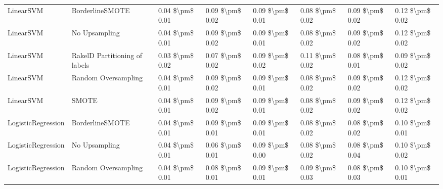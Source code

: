 \begin{tabular}{llllllll}
                      LinearSVM &               BorderlineSMOTE & 0.04 \$\textbackslash pm\$ 0.01 &           0.09 \$\textbackslash pm\$ 0.02 &       0.09 \$\textbackslash pm\$ 0.01 &        0.08 \$\textbackslash pm\$ 0.02 &                         0.09 \$\textbackslash pm\$ 0.02 &     0.12 \$\textbackslash pm\$ 0.02 \\
                      LinearSVM &                 No Upsampling & 0.04 \$\textbackslash pm\$ 0.01 &           0.09 \$\textbackslash pm\$ 0.02 &       0.09 \$\textbackslash pm\$ 0.01 &        0.08 \$\textbackslash pm\$ 0.02 &                         0.09 \$\textbackslash pm\$ 0.02 &     0.12 \$\textbackslash pm\$ 0.02 \\
                      LinearSVM & RakelD Partitioning of labels & 0.03 \$\textbackslash pm\$ 0.02 &           0.07 \$\textbackslash pm\$ 0.02 &       0.09 \$\textbackslash pm\$ 0.02 &        0.11 \$\textbackslash pm\$ 0.02 &                         0.08 \$\textbackslash pm\$ 0.01 &     0.09 \$\textbackslash pm\$ 0.02 \\
                      LinearSVM &           Random Oversampling & 0.04 \$\textbackslash pm\$ 0.01 &           0.09 \$\textbackslash pm\$ 0.02 &       0.09 \$\textbackslash pm\$ 0.01 &        0.08 \$\textbackslash pm\$ 0.02 &                         0.09 \$\textbackslash pm\$ 0.02 &     0.12 \$\textbackslash pm\$ 0.02 \\
                      LinearSVM &                         SMOTE & 0.04 \$\textbackslash pm\$ 0.01 &           0.09 \$\textbackslash pm\$ 0.02 &       0.09 \$\textbackslash pm\$ 0.01 &        0.08 \$\textbackslash pm\$ 0.02 &                         0.09 \$\textbackslash pm\$ 0.02 &     0.12 \$\textbackslash pm\$ 0.02 \\
             LogisticRegression &               BorderlineSMOTE & 0.04 \$\textbackslash pm\$ 0.01 &           0.09 \$\textbackslash pm\$ 0.01 &       0.09 \$\textbackslash pm\$ 0.01 &        0.08 \$\textbackslash pm\$ 0.02 &                         0.08 \$\textbackslash pm\$ 0.02 &     0.10 \$\textbackslash pm\$ 0.01 \\
             LogisticRegression &                 No Upsampling & 0.04 \$\textbackslash pm\$ 0.01 &           0.06 \$\textbackslash pm\$ 0.01 &       0.09 \$\textbackslash pm\$ 0.00 &        0.08 \$\textbackslash pm\$ 0.02 &                         0.08 \$\textbackslash pm\$ 0.04 &     0.10 \$\textbackslash pm\$ 0.02 \\
             LogisticRegression &           Random Oversampling & 0.04 \$\textbackslash pm\$ 0.01 &           0.08 \$\textbackslash pm\$ 0.01 &       0.09 \$\textbackslash pm\$ 0.01 &        0.09 \$\textbackslash pm\$ 0.03 &                         0.08 \$\textbackslash pm\$ 0.03 &     0.10 \$\textbackslash pm\$ 0.01 \\

\end{tabular}
